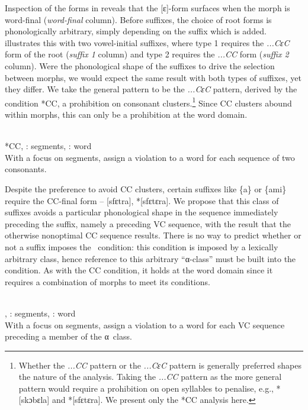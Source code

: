 Inspection of the forms in  reveals that the [ɛ]-form surfaces when the morph is word-final ({\it word-final} column). Before suffixes, the choice of root forms is phonologically arbitrary, simply depending on the suffix which is added.  illustrates this with two vowel-initial suffixes, where type 1 requires the {\it ...CɛC} form of the root ({\it suffix 1} column) and type 2 requires the {\it ...CC} form ({\it suffix 2} column). Were the phonological shape of the suffixes to drive the selection between morphs, we would expect the same result with both types of suffixes, yet they differ.   We take the general pattern to be the {\it ...CɛC} pattern, derived by the condition *CC, a prohibition on consonant clusters.\footnote{Whether the {\it ...CC} pattern or the {\it ...CɛC} pattern is generally preferred shapes the nature of the analysis. Taking the {\it ...CC} pattern as the more general pattern would require a prohibition on open syllables to penalise, e.g., *[skɔbɛla] and *[sfɛtɛra]. We present only the *CC analysis here.} Since CC clusters abound within morphs, this can only be a prohibition at the word domain.


\begin{example} \label{Polish_*CC}\\
*CC, \tier: segments, \dom: word\\
With a focus on segments, assign a violation to a word for each sequence of two consonants.
\end{example}

Despite the preference to avoid CC clusters, certain suffixes like \{a\} or \{ami\} require the CC-final form -- [sfɛtra], *[sfɛtɛra]. We propose that this class of suffixes avoids a particular phonological shape in the sequence immediately preceding the suffix, namely a preceding VC sequence, with the result that the otherwise nonoptimal CC sequence results. There is no way to predict whether or not a suffix imposes the \PolVC\  condition: this condition is imposed by a lexically arbitrary class, hence reference to this arbitrary ``α-class'' must be built into the condition. As with the CC condition, it holds at the word domain since it requires a combination of morphs to meet its conditions.

\begin{example}  \label{Polish_*VC}\\
\PolVC, \tier: segments, \dom: word\\
With a focus on segments, assign a violation to a word for each VC sequence preceding a member of the α\ class.
\end{example}

